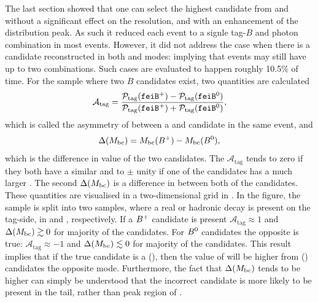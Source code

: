 The last section showed that one can select the highest \feiProb candidate from \feiBp and \feiBz without a significant effect on the \EB resolution, and with an enhancement of the \Mbc distribution peak.
As such it reduced each event to a signle tag-$B$ and photon combination in most events.
However, it did not address the case when there is a candidate reconstructed in both \feiBp and \feiBz modes: implying that events may still have up to two combinations.
Such cases are evaluated to happen roughly 10.5\% of time. 
For the sample where two $B$ candidates exist, two quantities are calculated
\begin{equation}\label{eq:asymmetry_tag}
    \mathcal{A}_{\mathrm{tag}} = \frac{\mathcal{P}_{\mathrm{tag}}({\texttt{feiB}^+}) - \mathcal{P}_{\mathrm{tag}}({\texttt{feiB}^0})}{\mathcal{P}_{\mathrm{tag}}({\texttt{feiB}^+}) + \mathcal{P}_{\mathrm{tag}}({\texttt{feiB}^0})},
\end{equation}
which is called the asymmetry of \feiProb between a \feiBp and \feiBz candidate in the same event, and
\begin{equation}\label{eq:delta_mbc}
    \Delta({M_{\mathrm{bc}}}) = {M_{\mathrm{bc}}}(B^+) - {M_{\mathrm{bc}}}(B^0),
\end{equation}
which is the difference in \Mbc value of the two candidates.
The $\mathcal{A}_{\mathrm{tag}}$ tends to zero if they both have a similar \feiProb and to $\pm$ unity if one of the candidates has a much larger \feiProb.
The second $\Delta({M_{\mathrm{bc}}})$ is a difference in \Mbc between both of the candidates.
These quantities are visualised in a two-dimensional grid in .
In the figure, the sample is split into two samples, where a real \Bp or \Bz hadronic decay is present on the tag-side, in  and , respectively.
If a $B^+$ candidate is present $\mathcal{A}_{\mathrm{tag}}\approx1$ and $\Delta({M_{\mathrm{bc}}})\gtrsim 0$ for majority of the candidates.
For $B^0$ candidates the opposite is true: $\mathcal{A}_{\mathrm{tag}}\approx-1$ and $\Delta({M_{\mathrm{bc}}})\lesssim 0$ for majority of the candidates.
This result implies that if the true candidate is a \Bp(\Bz), then the value of \feiProb will be higher from \feiBp (\feiBz) candidates the opposite \FEI mode.
Furthermore, the fact that $\Delta({M_{\mathrm{bc}}})$ tends to be higher can simply be understood that the incorrect candidate is more likely to be present in the tail, rather than peak region of \Mbc.

